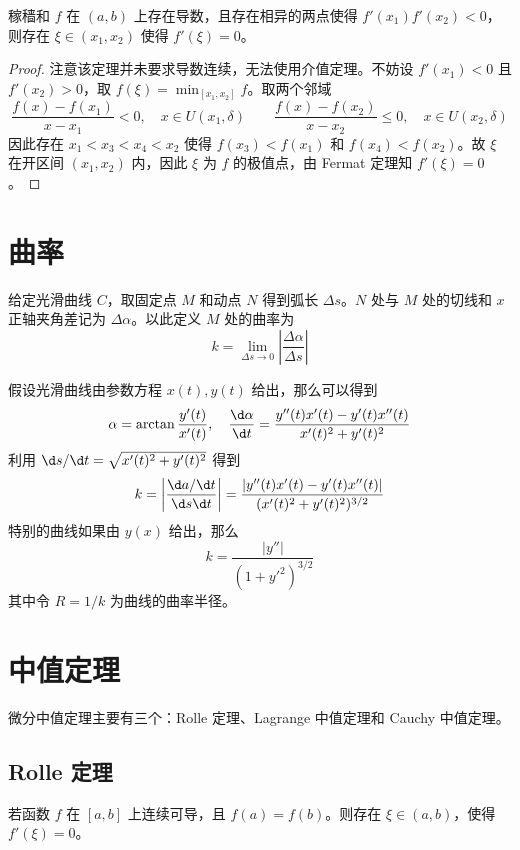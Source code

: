 \begin{theorem}[Darboux 定理]
	稼穑和 $f$ 在 $(a, b)$ 上存在导数，且存在相异的两点使得 $f'(x_1)f'(x_2) < 0$，则存在 $\xi \in (x_1, x_2)$ 使得 $f'(\xi) = 0$。
\end{theorem}

\begin{proof}
	注意该定理并未要求导数连续，无法使用介值定理。不妨设 $f'(x_1) < 0$ 且 $f'(x_2) > 0$，取 $f(\xi) = \min_{[x_1, x_2]} f$。取两个邻域
	\[ \frac{f(x) - f(x_1)}{x - x_1} < 0, \quad x \in U(x_1, \delta) \qquad
		\frac{f(x) - f(x_2)}{x - x_2} \leqslant 0, \quad x \in U(x_2, \delta) \]
	因此存在 $x_1 < x_3 < x_4 < x_2$ 使得 $f(x_3) < f(x_1)$ 和 $f(x_4) < f(x_2)$。故 $\xi$ 在开区间 $(x_1, x_2)$ 内，因此 $\xi$ 为 $f$ 的极值点，由 Fermat 定理知 $f'(\xi) = 0$。
\end{proof}

\section{曲率}

给定光滑曲线 $C$，取固定点 $M$ 和动点 $N$ 得到弧长 $\Delta s$。$N$ 处与 $M$ 处的切线和 $x$ 正轴夹角差记为 $\Delta \alpha$。以此定义 $M$ 处的曲率为
\[ k = \lim_{\Delta s \to 0} \left| \frac{\Delta \alpha}{\Delta s} \right| \]

假设光滑曲线由参数方程 $x(t), y(t)$ 给出，那么可以得到
\[ \alpha = \arctan \frac{y'(t)}{x'(t)}, \quad \frac{\d \alpha}{\d t} = \frac{y''(t)x'(t) - y'(t) x''(t)}{x'(t)^2 + y'(t)^2} \]
利用 $\d s/ \d t = \sqrt{x'(t)^2 + y'(t)^2}$ 得到
\[ k = \left| \frac{\d a / \d t}{\d s \d t} \right| = \frac{|y''(t)x'(t) - y'(t) x''(t)|}{(x'(t)^2 + y'(t)^2)^{3/2}} \]
特别的曲线如果由 $y(x)$ 给出，那么
\[ k = \frac{|y''|}{(1+y'^2)^{3/2}} \]
其中令 $R = 1/k$ 为曲线的曲率半径。

\section{中值定理}

微分中值定理主要有三个：Rolle 定理、Lagrange 中值定理和 Cauchy 中值定理。

\subsection{Rolle 定理}

\begin{theorem}
	若函数 $f$ 在 $[a,b]$ 上连续可导，且 $f(a)=f(b)$。则存在 $\xi\in(a,b)$，使得 $f'(\xi)=0$。
\end{theorem}

